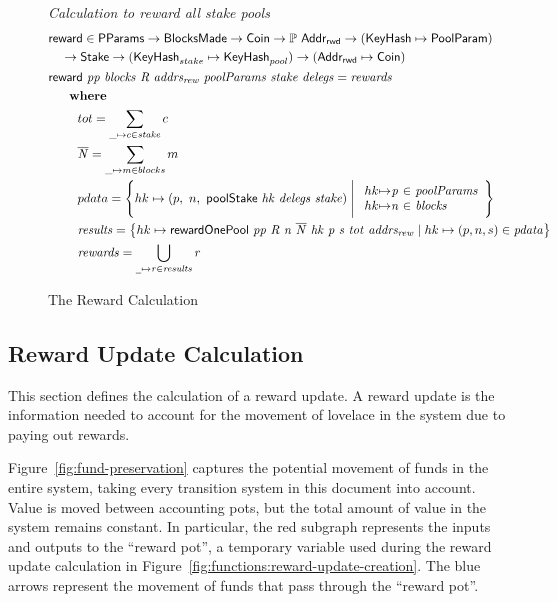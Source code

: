 \begin{figure}[htb]
  \emph{Calculation to reward all stake pools}
  \begin{align*}
      & \fun{reward} \in \PParams \to \BlocksMade \to \Coin\to \powerset{\AddrRWD}
      \to (\KeyHash \mapsto \PoolParam) \\
      & ~~~\to \Stake \to (\KeyHash_{stake} \mapsto \KeyHash_{pool}) \to
      (\AddrRWD \mapsto \Coin)\\
      & \reward{pp}{blocks}{R}{addrs_{rew}}{poolParams}{stake}{delegs}
          = \var{rewards}\\
      & ~~~\where \\
      & ~~~~~~~tot = \sum_{\_\mapsto c\in \var{stake}}c \\
      & ~~~~~~~\var{\overline{N}} = \sum_{\_\mapsto m\in blocks}m \\
      & ~~~~~~~pdata = \left\{
        hk\mapsto \left(p,~n,~\poolStake{hk}{delegs}{stake}\right)
        \mathrel{\Bigg|}
        \begin{array}{r@{\mapsto}c@{~\in~}l}
          hk & \var{p} & \var{poolParams} \\
          hk & \var{n} & \var{blocks} \\
        \end{array}
      \right\} \\
      & ~~~~~~~\var{results} = \left\{
        hk \mapsto \rewardOnePool{pp}{R}{n}{\overline{N}}{hk}{p}{s}{tot}{addrs_{rew}}
                 \mid
        hk\mapsto(p, n, s)\in\var{pdata} \right\} \\
      & ~~~~~~~\var{rewards} = \bigcup_{\wcard\mapsto\var{r}\in\var{results}}\var{r}
  \end{align*}
  \caption{The Reward Calculation}
  \label{fig:functions:reward-calc}
\end{figure}

\clearpage

\subsection{Reward Update Calculation}
\label{sec:reward-calc}

This section defines the calculation of a reward update.
A reward update is the information needed to account for the movement of lovelace
in the system due to paying out rewards.

Figure~\ref{fig:fund-preservation} captures the potential movement of funds in the entire system,
taking every transition system in this document into account.  Value is moved between
accounting pots, but the total amount of value in the system remains constant.
In particular, the red subgraph represents the inputs and outputs to
the ``reward pot'', a temporary variable used during the reward update calculation in
Figure~\ref{fig:functions:reward-update-creation}.
The blue arrows represent the movement of funds that pass through the ``reward pot''.


